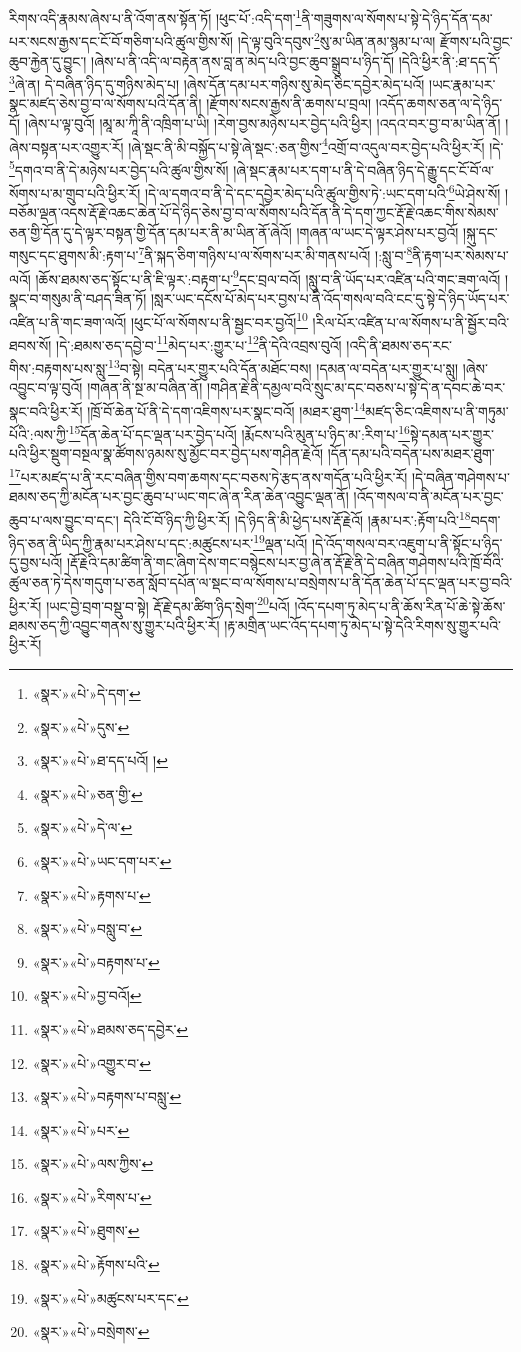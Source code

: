 རིགས་འདི་རྣམས་ཞེས་པ་ནི་འོག་ནས་སྟོན་ཏོ། །ཕུང་པོ་:འདི་དག་\footnote{«སྣར་»«པེ་»དེ་དག་}ནི་གཟུགས་ལ་སོགས་པ་སྟེ་དེ་ཉིད་དོན་དམ་པར་སངས་རྒྱས་དང་ངོ་བོ་གཅིག་པའི་ཚུལ་གྱིས་སོ། །དེ་ལྟ་བུའི་དབུས་\footnote{«སྣར་»«པེ་»དུས་}སུ་མ་ཡིན་ནམ་སྙམ་པ་ལ། རྫོགས་པའི་བྱང་ཆུབ་རྐྱེན་དུ་བྱུང་། །ཞེས་པ་ནི་འདི་ལ་བརྟེན་ནས་བླ་ན་མེད་པའི་བྱང་ཆུབ་སྒྲུབ་པ་ཉིད་དོ། །དེའི་ཕྱིར་ནི་:ཐ་དད་དོ་\footnote{«སྣར་»«པེ་»ཐ་དད་པའོ། །}ཞེ་ན། དེ་བཞིན་ཉིད་དུ་གཉིས་མེད་པ། །ཞེས་དོན་དམ་པར་གཉིས་སུ་མེད་ཅིང་དབྱེར་མེད་པའོ། །ཡང་རྣམ་པར་སྣང་མཛད་ཅེས་བྱ་བ་ལ་སོགས་པའི་དོན་ནི། །རྫོགས་སངས་རྒྱས་ནི་ཆགས་པ་བྲལ། །འདོད་ཆགས་ཅན་ལ་དེ་ཉིད་དོ། །ཞེས་པ་ལྟ་བུའོ། །མཱ་མ་ཀཱི་ནི་འཁྲིག་པ་ཡི། །རེག་བྱས་མཉེས་པར་བྱེད་པའི་ཕྱིར། །འདའ་བར་བྱ་བ་མ་ཡིན་ནོ། །ཞེས་བསྟན་པར་འགྱུར་རོ། །ཞེ་སྡང་ནི་མི་བསྐྱོད་པ་སྟེ་ཞེ་སྡང་:ཅན་གྱིས་\footnote{«སྣར་»«པེ་»ཅན་གྱི་}འགྲོ་བ་འདུལ་བར་བྱེད་པའི་ཕྱིར་རོ། །དེ་\footnote{«སྣར་»«པེ་»དེ་ལ་}དགའ་བ་ནི་དེ་མཉེས་པར་བྱེད་པའི་ཚུལ་གྱིས་སོ། །ཞེ་སྡང་རྣམ་པར་དག་པ་ནི་དེ་བཞིན་ཉིད་དེ་རྒྱུ་དང་ངོ་བོ་ལ་སོགས་པ་མ་གྲུབ་པའི་ཕྱིར་རོ། །དེ་ལ་དགའ་བ་ནི་དེ་དང་དབྱེར་མེད་པའི་ཚུལ་གྱིས་ཏེ་:ཡང་དག་པའི་\footnote{«སྣར་»«པེ་»ཡང་དག་པར་}ཡེ་ཤེས་སོ། །བཅོམ་ལྡན་འདས་རྡོ་རྗེ་འཆང་ཆེན་པོ་དེ་ཉིད་ཅེས་བྱ་བ་ལ་སོགས་པའི་དོན་ནི་དེ་དག་ཀྱང་རྡོ་རྗེ་འཆང་གིས་སེམས་ཅན་གྱི་དོན་དུ་དེ་ལྟར་བསྟན་གྱི་དོན་དམ་པར་ནི་མ་ཡིན་ནོ་ཞེའོ། །གཞན་ལ་ཡང་དེ་ལྟར་ཤེས་པར་བྱའོ། །སྐུ་དང་གསུང་དང་ཐུགས་མི་:རྟག་པ་\footnote{«སྣར་»«པེ་»རྟགས་པ་}ནི་སྐད་ཅིག་གཉིས་པ་ལ་སོགས་པར་མི་གནས་པའོ། །:སླུ་བ་\footnote{«སྣར་»«པེ་»བསླུ་བ་}ནི་རྟག་པར་སེམས་པ་ལའོ། །ཆོས་ཐམས་ཅད་སྟོང་པ་ནི་ཇི་ལྟར་:བརྟག་པ་\footnote{«སྣར་»«པེ་»བརྟགས་པ་}དང་བྲལ་བའོ། །སླུ་བ་ནི་ཡོད་པར་འཛིན་པའི་གང་ཟག་ལའོ། །སྣང་བ་གསུམ་ནི་བཤད་ཟིན་ཏོ། །སླར་ཡང་དངོས་པོ་མེད་པར་བྱས་པ་ནི་འོད་གསལ་བའི་ངང་དུ་སྟེ་དེ་ཉིད་ཡོད་པར་འཛིན་པ་ནི་གང་ཟག་ལའོ། །ཕུང་པོ་ལ་སོགས་པ་ནི་སྦྱང་བར་བྱའོ།\footnote{«སྣར་»«པེ་»བྱ་བའོ།} །རིལ་པོར་འཛིན་པ་ལ་སོགས་པ་ནི་སྦྱོར་བའི་ཐབས་སོ། །དེ་:ཐམས་ཅད་དབྱེ་བ་\footnote{«སྣར་»«པེ་»ཐམས་ཅད་དབྱེར་}མེད་པར་:གྱུར་པ་\footnote{«སྣར་»«པེ་»འགྱུར་བ་}ནི་དེའི་འབྲས་བུའོ། །འདི་ནི་ཐམས་ཅད་རང་གིས་:བརྟགས་པས་སླུ་\footnote{«སྣར་»«པེ་»བརྟགས་པ་བསླུ་}བ་སྟེ། བདེན་པར་གྱུར་པའི་དོན་མཐོང་བས། །དམན་ལ་བདེན་པར་གྱུར་པ་སླུ། །ཞེས་འབྱུང་བ་ལྟ་བུའོ། །གཞན་ནི་སྔ་མ་བཞིན་ནོ། །གཤིན་རྗེ་ནི་དམྱལ་བའི་སྲུང་མ་དང་བཅས་པ་སྟེ་དེ་ན་དབང་ཆེ་བར་སྣང་བའི་ཕྱིར་རོ། །ཁྲོ་བོ་ཆེན་པོ་ནི་དེ་དག་འཇིགས་པར་སྣང་བའོ། །མཐར་ཐུག་\footnote{«སྣར་»«པེ་»པར་}མཛད་ཅིང་འཇིགས་པ་ནི་གཏུམ་པོའི་:ལས་ཀྱི་\footnote{«སྣར་»«པེ་»ལས་ཀྱིས་}དོན་ཆེན་པོ་དང་ལྡན་པར་བྱེད་པའོ། །རྨོངས་པའི་མུན་པ་ཉིད་མ་:རིག་པ་\footnote{«སྣར་»«པེ་»རིགས་པ་}སྟེ་དམན་པར་གྱུར་པའི་ཕྱིར་སྡུག་བསྔལ་སྣ་ཚོགས་ཉམས་སུ་མྱོང་བར་བྱེད་པས་གཤིན་རྗེའོ། །དོན་དམ་པའི་བདེན་པས་མཐར་ཐུག་\footnote{«སྣར་»«པེ་»ཐུགས་}པར་མཛད་པ་ནི་རང་བཞིན་གྱིས་བག་ཆགས་དང་བཅས་ཏེ་རྩད་ནས་གདོན་པའི་ཕྱིར་རོ། །དེ་བཞིན་གཤེགས་པ་ཐམས་ཅད་ཀྱི་མངོན་པར་བྱང་ཆུབ་པ་ཡང་གང་ཞེ་ན་རིན་ཆེན་འབྱུང་ལྡན་ནོ། །འོད་གསལ་བ་ནི་མངོན་པར་བྱང་ཆུབ་པ་ལས་བྱུང་བ་དང་། དེའི་ངོ་བོ་ཉིད་ཀྱི་ཕྱིར་རོ། །དེ་ཉིད་ནི་མི་ཕྱེད་པས་རྡོ་རྗེའོ། །རྣམ་པར་:རྟོག་པའི་\footnote{«སྣར་»«པེ་»རྟོགས་པའི་}བདག་ཉིད་ཅན་ནི་ཡིད་ཀྱི་རྣམ་པར་ཤེས་པ་དང་:མཚུངས་པར་\footnote{«སྣར་»«པེ་»མཚུངས་པར་དང་}ལྡན་པའོ། །དེ་འོད་གསལ་བར་འཇུག་པ་ནི་སྟོང་པ་ཉིད་དུ་བྱས་པའོ། །རྡོ་རྗེའི་དམ་ཚིག་ནི་གང་ཞིག་དེས་གང་བསྙེངས་པར་བྱ་ཞེ་ན་རྡོ་རྗེ་ནི་དེ་བཞིན་གཤེགས་པའི་ཁྲོ་བོའི་ཚུལ་ཅན་ཏེ་དེས་གདུག་པ་ཅན་སློབ་དཔོན་ལ་སྡང་བ་ལ་སོགས་པ་བསྲེགས་པ་ནི་དོན་ཆེན་པོ་དང་ལྡན་པར་བྱ་བའི་ཕྱིར་རོ། །ཡང་བྱེ་བྲག་བསྡུ་བ་སྟེ། རྡོ་རྗེ་དམ་ཚིག་ཉིད་སྲེག་\footnote{«སྣར་»«པེ་»བསྲེགས་}པའོ། །འོད་དཔག་ཏུ་མེད་པ་ནི་ཆོས་རིན་པོ་ཆེ་སྟེ་ཆོས་ཐམས་ཅད་ཀྱི་འབྱུང་གནས་སུ་གྱུར་པའི་ཕྱིར་རོ། །རྟ་མགྲིན་ཡང་འོད་དཔག་ཏུ་མེད་པ་སྟེ་དེའི་རིགས་སུ་གྱུར་པའི་ཕྱིར་རོ། 